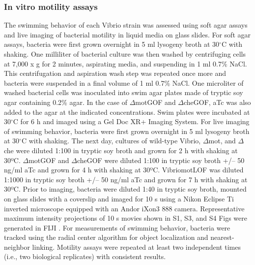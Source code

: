 \subsubsection{In vitro motility assays}
The swimming behavior of each Vibrio strain was assessed using soft agar assays and live imaging of bacterial motility in liquid media on glass slides. For soft agar assays, bacteria were first grown overnight in 5 ml lysogeny broth at 30$^\circ$C with shaking. One milliliter of bacterial culture was then washed by centrifuging cells at 7,000 x g for 2 minutes, aspirating media, and suspending in 1 ml 0.7\% NaCl. This centrifugation and aspiration wash step was repeated once more and bacteria were suspended in a final volume of 1 ml 0.7\% NaCl. One microliter of washed bacterial cells was inoculated into swim agar plates made of tryptic soy agar containing 0.2\% agar. In the case of $\Delta$motGOF and $\Delta$cheGOF, aTc was also added to the agar at the indicated concentrations. Swim plates were incubated at 30$^\circ$C for 6 h and imaged using a Gel Doc XR+ Imaging System. For live imaging of swimming behavior, bacteria were first grown overnight in 5 ml lysogeny broth at 30$^\circ$C with shaking. The next day, cultures of wild-type Vibrio, $\Delta$mot, and $\Delta$che were diluted 1:100 in tryptic soy broth and grown for 2 h with shaking at 30ºC. $\Delta$motGOF and $\Delta$cheGOF were diluted 1:100 in tryptic soy broth +/– 50 ng/ml aTc and grown for 4 h with shaking at 30ºC. VibriomotLOF was diluted 1:1000 in tryptic soy broth +/– 50 ng/ml aTc and grown for 7 h with shaking at 30ºC. Prior to imaging, bacteria were diluted 1:40 in tryptic soy broth, mounted on glass slides with a coverslip and imaged for 10 s using a Nikon Eclipse Ti inverted microscope equipped with an Andor iXon3 888 camera. Representative maximum intensity projections of 10 s movies shown in S1, S3, and S4 Figs were generated in FIJI \cite{schindelin_fiji_2012}. For measurements of swimming behavior, bacteria were tracked using the radial center algorithm \cite{parthasarathy_rapid_2012} for object localization and nearest-neighbor linking. Motility assays were repeated at least two independent times (i.e., two biological replicates) with consistent results. 

